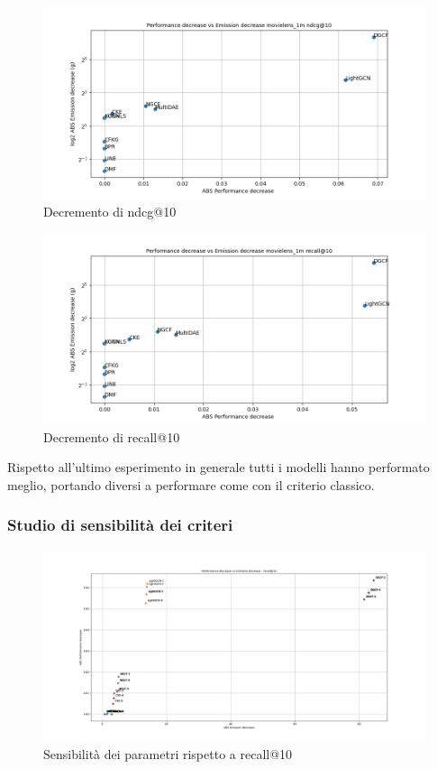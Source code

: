 \begin{figure}[H]
    \centering
     \includegraphics[width=\textwidth]{images/decrement_ndcg@10_movielens_1m_30_7.png}
    \caption{Decremento di ndcg@10}
\end{figure}

\begin{figure}[H]
    \centering
     \includegraphics[width=\textwidth]{images/decrement_recall@10_movielens_1m_30_7.png}
    \caption{Decremento di recall@10}
\end{figure}

\noindent Rispetto all'ultimo esperimento in generale tutti i modelli hanno performato meglio, portando diversi a performare come con il criterio classico.


\subsubsection{Studio di sensibilità dei criteri}

\begin{figure}[H]
    \includegraphics[width=\textwidth]{images/sensibility_recall@10.png}
    \caption{Sensibilità dei parametri rispetto a recall@10}
\end{figure}

